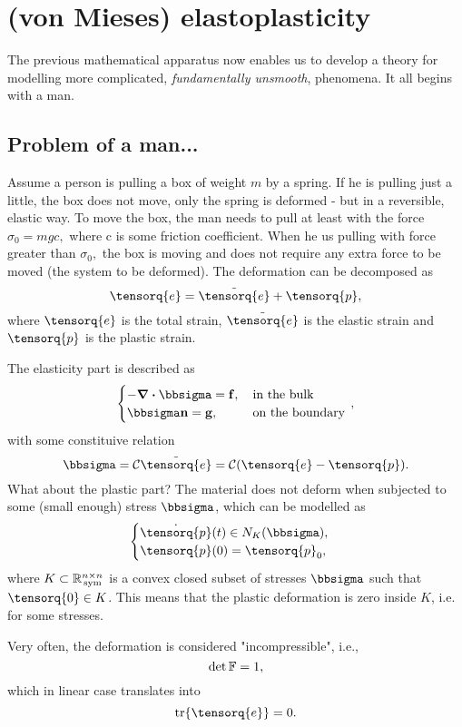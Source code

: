 \documentclass[11pt]{scrartcl} %
\begin{document}
\section{(von Mieses) elastoplasticity}
\label{sec:elastoplasticity} 

The previous mathematical apparatus now enables us to develop a theory for modelling more complicated, \textit{fundamentally unsmooth}, phenomena. It all begins with a man.

\subsection{Problem of a man...}
\label{sec:problem}

Assume a person is pulling a box of weight $m$ by a spring. If he is pulling just a little, the box does not move, only the spring is deformed - but in a reversible, elastic way.
To move the box, the man needs to pull at least with the force $\sigma_0 = mgc,$ where c is some friction coefficient. When he us pulling with force greater than $\sigma_0,$ the box is moving and does not require any extra force to be moved (the system to be deformed). The deformation can be decomposed as
\[
	\tensorq{e} = \tilde{\tensorq{e}} + \tensorq{p},
\]
where $\tensorq{e}$ is the total strain, $\tilde{\tensorq{e}}$ is the elastic strain and $\tensorq{p}$ is the plastic strain.


The elasticity part is described as
\[
	\begin{cases}
		- \divergence{\bbsigma} = \vb{f}, &  \, \text{in the bulk} \,\\
		\bbsigma \vb{n} = \vb{g}, & \, \text{on the boundary} \, \\
	\end{cases},
\]
with some constituive relation
\[
	\bbsigma = \mathcal{C}\tilde{\tensorq{e}} = \mathcal{C}\qty(\tensorq{e}-\tensorq{p}).
\]
What about the plastic part? The material does not deform when subjected to some (small enough) stress $\bbsigma$, which can be modelled as
\[
	\begin{cases} 
		\dot{\tensorq{p}}(t) \in N_K\qty(\bbsigma), & \\
		\tensorq{p}(0)=\tensorq{p}_0, &
	\end{cases}
\]
where $K \subset {\mathbb R}^{n \times n}_{\, \text{sym} \,}$ is a convex closed subset of stresses $\bbsigma$ such that $\tensorq{0} \in K$. This means that the plastic deformation is zero inside $K$, i.e. for some stresses. 

\begin{remark}
    Very often, the deformation is considered "incompressible", i.e.,
    \[
	    \det \mathbb{F} = 1,
    \]
    which in linear case translates into
    \[
	    \tr \tensorq{e} = 0.
    \]
\end{remark}
\end{document}

